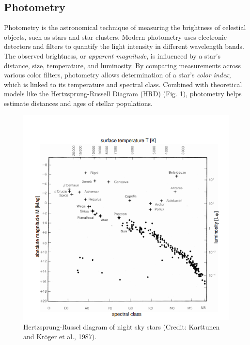 \documentclass[12pt,a4paper]{article}
\begin{document}
 
  \subsection{Photometry}
  Photometry is the astronomical technique of measuring the brightness of celestial objects, such as stars and star clusters. Modern photometry uses electronic detectors and filters to quantify the light intensity in different wavelength bands.
  The observed brightness, or \textit{apparent magnitude}, is influenced by a star's distance, size, temperature, and luminosity. By comparing measurements across various color filters, photometry allows determination of a star's \textit{color index}, which is linked to its temperature and spectral class. Combined with theoretical models like the Hertzsprung-Russell Diagram (HRD) (Fig. \ref{fig:HR_Dia}), photometry helps estimate distances and ages of stellar populations.
  \begin{figure}[H]
    \centering
    \includegraphics[width=1.1\textwidth]{Pictures/HRD.png}
    \caption{Hertzsprung-Russel diagram of night sky stars (Credit: Karttunen and Kröger et al., 1987).}
    \label{fig:HR_Dia}
  \end{figure}
\end{document}
